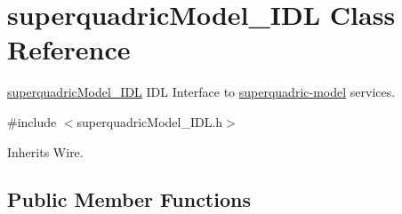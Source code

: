 \section{superquadric\-Model\-\_\-\-I\-D\-L Class Reference}
\label{classsuperquadricModel__IDL}


\hyperlink{classsuperquadricModel__IDL}{superquadric\-Model\-\_\-\-I\-D\-L} I\-D\-L Interface to \hyperlink{group__superquadric-model}{superquadric-\/model} services.  




{\ttfamily \#include $<$superquadric\-Model\-\_\-\-I\-D\-L.\-h$>$}



Inherits Wire.

\subsection*{Public Member Functions}
